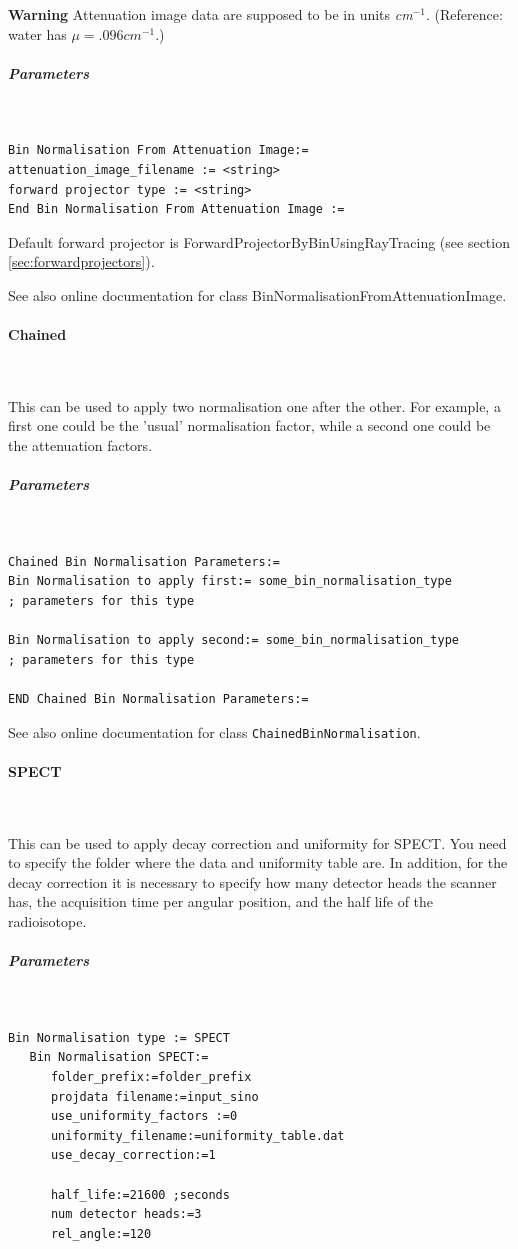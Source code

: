 \documentclass{article}
\newcommand{\subsubsubsection}[1]{\paragraph{#1}\mbox{} \\}
\newcommand{\subsubsubsubsection}[1]{\subparagraph{#1} \mbox{} \\}
\begin{document}
{{{{{{\textbf{Warning} Attenuation image data are supposed to be in units \textit{cm}$^{-1}$. 
(Reference: water has $\mu=.096 \mathit{cm}^{-1}$.)

{ \subsubsubsubsection{Parameters}
}
\begin{verbatim}
Bin Normalisation From Attenuation Image:=
attenuation_image_filename := <string>
forward projector type := <string>
End Bin Normalisation From Attenuation Image :=
\end{verbatim}


Default forward projector is ForwardProjectorByBinUsingRayTracing 
(see section \ref{sec:forwardprojectors}).


See also online documentation for class BinNormalisationFromAttenuationImage.

{ \subsubsubsection{Chained }
}
\label{sec:chainedbinnormalisation}
This can be used to apply two normalisation one after the other. 
For example, a first one could be the 'usual' normalisation factor, 
while a second one could be the attenuation factors.

{ \subsubsubsubsection{Parameters}
}
\begin{verbatim}
Chained Bin Normalisation Parameters:=
Bin Normalisation to apply first:= some_bin_normalisation_type
; parameters for this type

Bin Normalisation to apply second:= some_bin_normalisation_type
; parameters for this type

END Chained Bin Normalisation Parameters:=
\end{verbatim}

See also online documentation for class \texttt{ChainedBinNormalisation}.

{ \subsubsubsection{SPECT }
}
\label{sec:SPECTbinnormalisation}
This can be used to apply decay correction and uniformity for SPECT. You need to specify the folder where the data and uniformity table are. In addition, for the decay correction it is necessary to specify how many detector heads the scanner has, the acquisition time per angular position, and  the half life of the radioisotope.

{ \subsubsubsubsection{Parameters}
}
\begin{verbatim}
Bin Normalisation type := SPECT
   Bin Normalisation SPECT:=
      folder_prefix:=folder_prefix
      projdata filename:=input_sino
      use_uniformity_factors :=0
      uniformity_filename:=uniformity_table.dat
      use_decay_correction:=1
     
      half_life:=21600 ;seconds
      num detector heads:=3
      rel_angle:=120
      

\end{verbatim}}}}}}}
\end{document}
